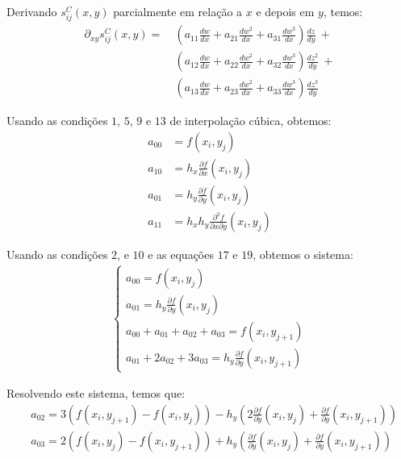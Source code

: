 \documentclass[a4paper, 12pt]{article}
\begin{document}
Derivando $s_{ij}^C(x,y)$ parcialmente em relação a $x$ e depois em $y$, temos:
\begin{align*}
    \partial_{xy}s_{ij}^C(x, y) =\ &\left(a_{11}\frac{dw}{dx} + a_{21}\frac{dw^2}{dx} + a_{31}\frac{dw^3}{dx}\right)
                            \frac{dz}{dy}\ + \\ 
                            &\left(a_{12}\frac{dw}{dx} + a_{22}\frac{dw^2}{dx} + a_{32}\frac{dw^3}{dx}\right)
                            \frac{dz^2}{dy}\ + \\ 
                            &\left(a_{13}\frac{dw}{dx} + a_{23}\frac{dw^2}{dx} + a_{33}\frac{dw^3}{dx}\right)
                            \frac{dz^3}{dy} 
\end{align*}

Usando as condições $1$,  $5$, $9$ e $13$ de interpolação cúbica, obtemos:
\begin{align}
    a_{00} &= f(x_{i}, y_{j}) \tag{17}\\
    a_{10} &= h_{x} \frac{\partial f}{\partial x}(x_{i}, y_{j}) \tag{18} \\
    a_{01} &= h_{y} \frac{\partial f}{\partial y}(x_i, y_j) \tag{19} \\
    a_{11} &= h_x h_y \frac{\partial^2 f}{\partial x \partial y}(x_i, y_j) \tag{20}
\end{align}

Usando as condições $2$, e $10$ e as equações $17$ e $19$, obtemos o sistema:
\begin{align*}
    \begin{cases}
        a_{00} = f(x_{i}, y_{j}) \\
        a_{01} = h_y \frac{\partial f}{\partial y}(x_i, y_j) \\
        a_{00} + a_{01} + a_{02} + a_{03} = f(x_i, y_{j+1}) \\
        a_{01} + 2a_{02} + 3a_{03} = h_y \frac{\partial f}{\partial y}(x_i, y_{j+1}) 
    \end{cases}
\end{align*}

Resolvendo este sistema, temos que:
\begin{align}
    &a_{02} = 3(f(x_i, y_{j+1}) - f(x_i, y_j)) - 
        h_y \left(2\frac{\partial f}{\partial y}(x_i, y_j) + \frac{\partial f}{\partial y}(x_i,y_{j+1})\right)
    \tag{21} \\
    &a_{03} = 2(f(x_i, y_j) - f(x_i, y_{j+1})) + 
    h_y \left(\frac{\partial f}{\partial y}(x_i, y_j) + \frac{\partial f}{\partial y}(x_i,y_{j+1})\right)
    \tag{22}
\end{align}
\end{document}
